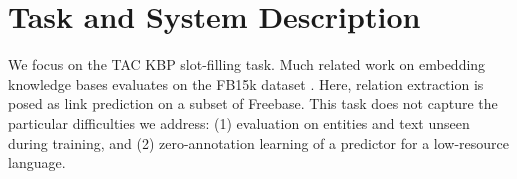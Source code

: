 






\section{Task and System Description}

We focus on the TAC KBP slot-filling task. Much related work on embedding knowledge bases evaluates on the FB15k dataset \citep{transe,wang2014knowledge,lin2015learning,bishan,toutanova2015representing}. Here, relation extraction is posed as link prediction on a subset of Freebase.  This task does not capture the particular difficulties we address: (1) evaluation on entities and text unseen during training, and (2) zero-annotation learning of a predictor for a low-resource language.


